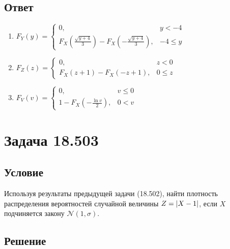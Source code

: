 \documentclass[12pt,a4paper]{article}
\begin{document}
    \subsection*{Ответ}
    \begin{enumerate}
        \item $F_Y(y)
        = \left \{
        \begin{array}{ll}
            0,                                                                                           & y < -4    \\
            F_X \left ( \frac{\sqrt{y + 4}}{3} \right ) - F_X \left ( - \frac{\sqrt{y + 4}}{3} \right ), & -4 \leq y
        \end{array}
        \right .
        $
        \item $F_Z(z)
        = \left \{
        \begin{array}{ll}
            0,                        & z < 0    \\
            F_X(z + 1) - F_X(-z + 1), & 0 \leq z
        \end{array}
        \right .
        $
        \item $
        F_V(v)
        = \left \{
        \begin{array}{ll}
            0,                                         & v \leq 0 \\
            1 - F_X \left ( -\frac{\ln v}{2} \right ), & 0 < v
        \end{array}
        \right .
        $
    \end{enumerate}


    \section{Задача 18.503}

    \subsection*{Условие}
    Используя результаты предыдущей задачи (18.502), найти плотность распределения вероятностей случайной величины $Z=\left | X-1 \right |$, если $X$ подчиняется закону
    $\mathcal{N}(1,\sigma)$.

    \subsection*{Решение}
\end{document}
